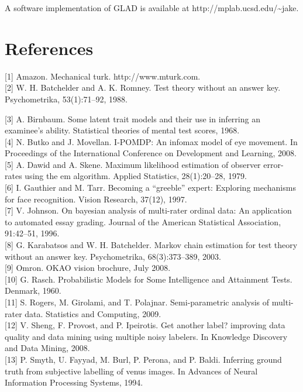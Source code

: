 \documentclass[
]{article}
\begin{document}
A software implementation of GLAD is available at
http://mplab.ucsd.edu/\textasciitilde jake.

\section{References}\label{references}

{[}1{]} Amazon. Mechanical turk. http://www.mturk.com.\\
{[}2{]} W. H. Batchelder and A. K. Romney. Test theory without an answer
key. Psychometrika, 53(1):71--92, 1988.

{[}3{]} A. Birnbaum. Some latent trait models and their use in inferring
an examinee's ability. Statistical theories of mental test scores,
1968.\\
{[}4{]} N. Butko and J. Movellan. I-POMDP: An infomax model of eye
movement. In Proceedings of the International Conference on Development
and Learning, 2008.\\
{[}5{]} A. Dawid and A. Skene. Maximum likelihood estimation of observer
error-rates using the em algorithm. Applied Statistics, 28(1):20--28,
1979.\\
{[}6{]} I. Gauthier and M. Tarr. Becoming a ``greeble'' expert:
Exploring mechanisms for face recognition. Vision Research, 37(12),
1997.\\
{[}7{]} V. Johnson. On bayesian analysis of multi-rater ordinal data: An
application to automated essay grading. Journal of the American
Statistical Association, 91:42--51, 1996.\\
{[}8{]} G. Karabatsos and W. H. Batchelder. Markov chain estimation for
test theory without an answer key. Psychometrika, 68(3):373--389,
2003.\\
{[}9{]} Omron. OKAO vision brochure, July 2008.\\
{[}10{]} G. Rasch. Probabilistic Models for Some Intelligence and
Attainment Tests. Denmark, 1960.\\
{[}11{]} S. Rogers, M. Girolami, and T. Polajnar. Semi-parametric
analysis of multi-rater data. Statistics and Computing, 2009.\\
{[}12{]} V. Sheng, F. Provost, and P. Ipeirotis. Get another label?
improving data quality and data mining using multiple noisy labelers. In
Knowledge Discovery and Data Mining, 2008.\\
{[}13{]} P. Smyth, U. Fayyad, M. Burl, P. Perona, and P. Baldi.
Inferring ground truth from subjective labelling of venus images. In
Advances of Neural Information Processing Systems, 1994.\\
\end{document}
